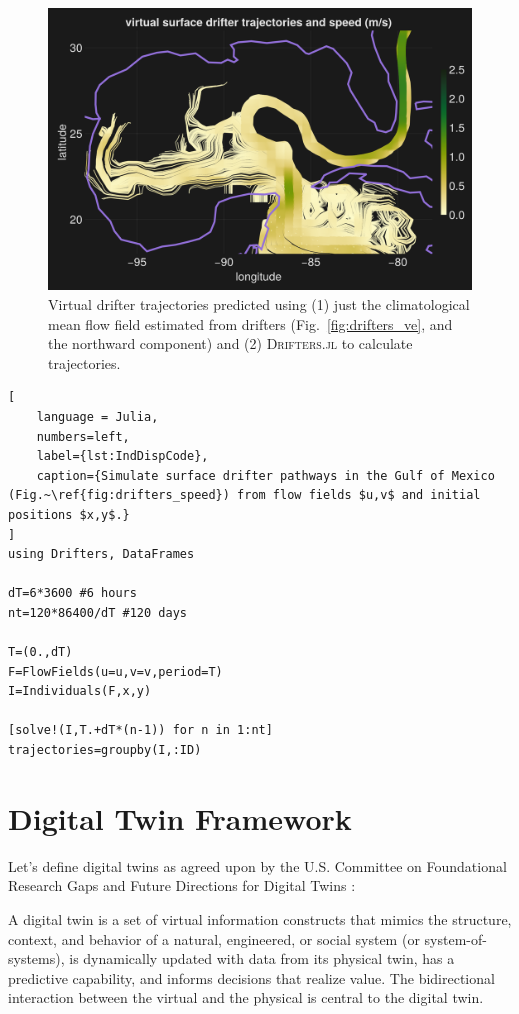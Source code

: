 \documentclass{juliacon}[12pt]
\newcommand{\pkg}[1]{{\small \textsc{#1}}}
\begin{document}
\begin{figure}[t]
\centerline{\includegraphics[width=\columnwidth]{figs/20240529_speed_subset_IndDisp.png}}
\caption{Virtual drifter trajectories predicted using (1) just the climatological mean flow field estimated from drifters (Fig.~\ref{fig:drifters_ve}, and the northward component) and (2) \pkg{Drifters.jl} to calculate trajectories.}
\label{fig:drifters_speed_simu}
\end{figure}


\begin{lstlisting}[
    language = Julia,
    numbers=left,
    label={lst:IndDispCode},
    caption={Simulate surface drifter pathways in the Gulf of Mexico (Fig.~\ref{fig:drifters_speed}) from flow fields $u,v$ and initial positions $x,y$.}
]
using Drifters, DataFrames

dT=6*3600 #6 hours
nt=120*86400/dT #120 days

T=(0.,dT)
F=FlowFields(u=u,v=v,period=T)
I=Individuals(F,x,y)

[solve!(I,T.+dT*(n-1)) for n in 1:nt]
trajectories=groupby(I,:ID)
\end{lstlisting}


\section{Digital Twin Framework} \label{sec:DT}

Let's define digital twins as agreed upon by the U.S. Committee on Foundational Research Gaps and Future Directions for Digital Twins \cite{DT2024} : 

\begin{defi}
A digital twin is a set of virtual information constructs that mimics the structure, context, and behavior of a natural, engineered, or social system (or system-of-systems), is dynamically updated with data from its physical twin, has a predictive capability, and informs decisions that realize value. The bidirectional interaction between the virtual and the physical is central to the digital twin.
\end{defi}
\end{document}
